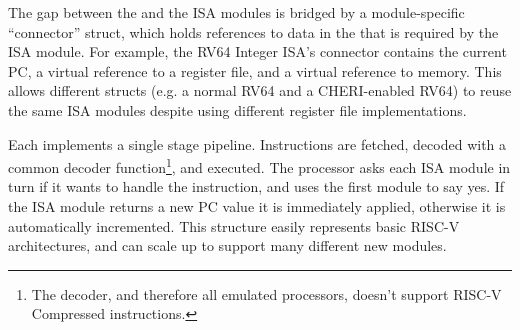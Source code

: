 \documentclass[../thesis]{subfiles}
\begin{document}
The gap between the  and the ISA modules is bridged by a module-specific ``connector'' struct, which holds references to data in the  that is required by the ISA module.
For example, the RV64 Integer ISA's connector contains the current PC, a virtual reference to a register file, and a virtual reference to memory.
This allows different  structs (e.g. a normal RV64 and a CHERI-enabled RV64) to reuse the same ISA modules despite using different register file implementations.

Each  implements a single stage pipeline.
Instructions are fetched, decoded with a common decoder function\footnote{The decoder, and therefore all emulated processors, doesn't support RISC-V Compressed instructions.}, and executed.
The processor asks each ISA module in turn if it wants to handle the instruction, and uses the first module to say yes.
If the ISA module returns a new PC value it is immediately applied, otherwise it is automatically incremented.
This structure easily represents basic RISC-V architectures, and can scale up to support many different new modules.








\end{document}
